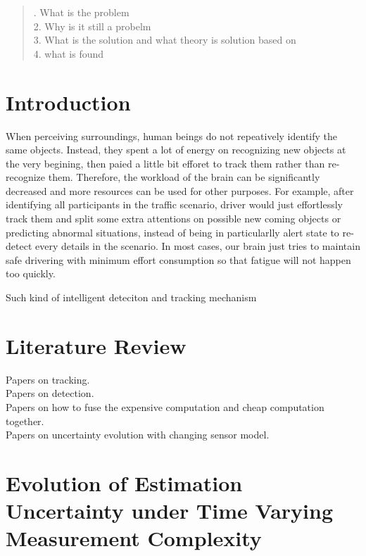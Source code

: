 \documentclass[12pt]{article}
\begin{document}
\maketitle

\begin{abstract}
. What is the problem\\
2. Why is it still a probelm\\
3. What is the solution and what theory is solution based on\\
4. what is found\\
\end{abstract}

\section{Introduction}\label{introduction}
\indent When perceiving surroundings, human beings do not repeatively identify the same objects. Instead, they spent a lot of energy on recognizing new objects at the very begining, then paied a little bit efforet to track them rather than re-recognize them. Therefore, the workload of the brain can be significantly decreased and more resources can be used for other purposes. For example, after identifying all participants in the traffic scenario, driver would just  effortlessly track them and split some extra attentions on possible new coming objects or predicting abnormal situations, instead of being in particularlly alert state to re-detect every details in the scenario. In most cases, our brain just tries to maintain safe drivering with minimum effort consumption so that fatigue will not happen too quickly.

Such kind of intelligent deteciton and tracking mechanism 

\section{Literature Review}\label{literature_review}
\noindent Papers on tracking.\\
Papers on detection.\\
Papers on how to fuse the expensive computation and cheap computation together.\\
Papers on uncertainty evolution with changing sensor model.

\section{Evolution of Estimation Uncertainty under Time Varying Measurement Complexity}\label{estmation_uncertainty}
\end{document}
